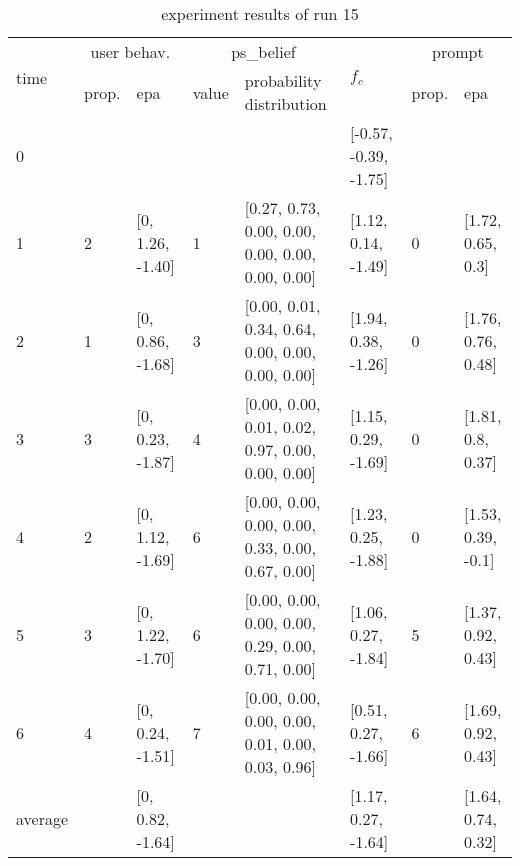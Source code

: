 \begin{table}[htbp]\footnotesize
\caption{experiment results of run 15}
\begin{center}
\begin{tabular}{|p{0.4cm}|p{0.6cm}|l|p{0.6cm}|p{3.3cm}|l|p{0.6cm}|l|}
\hline

\multirow{2}{*}{time} & \multicolumn{2}{c|}{user behav.} & \multicolumn{2}{c|}{ps\_belief} &
\multirow{2}{*}{$f_c$} & \multicolumn{2}{c|}{prompt} \\ \cline{2-5}\cline{ 7- 8}
& prop. & epa & value & probability distribution &  & prop. & epa \\ \hline

0 & \multicolumn{1}{l|}{} &  & \multicolumn{1}{l|}{} &  & [-0.57, -0.39, -1.75] & \multicolumn{1}{l|}{} &  \\ \hline
1 & 2 & [0, 1.26, -1.40] & 1 & [0.27, 0.73, 0.00, 0.00, 0.00, 0.00, 0.00, 0.00] & [1.12, 0.14, -1.49] & 0 & [1.72, 0.65, 0.3] \\ \hline
2 & 1 & [0, 0.86, -1.68] & 3 & [0.00, 0.01, 0.34, 0.64, 0.00, 0.00, 0.00, 0.00] & [1.94, 0.38, -1.26] & 0 & [1.76, 0.76, 0.48] \\ \hline
3 & 3 & [0, 0.23, -1.87] & 4 & [0.00, 0.00, 0.01, 0.02, 0.97, 0.00, 0.00, 0.00] & [1.15, 0.29, -1.69] & 0 & [1.81, 0.8, 0.37] \\ \hline
4 & 2 & [0, 1.12, -1.69] & 6 & [0.00, 0.00, 0.00, 0.00, 0.33, 0.00, 0.67, 0.00] & [1.23, 0.25, -1.88] & 0 & [1.53, 0.39, -0.1] \\ \hline
5 & 3 & [0, 1.22, -1.70] & 6 & [0.00, 0.00, 0.00, 0.00, 0.29, 0.00, 0.71, 0.00] & [1.06, 0.27, -1.84] & 5 & [1.37, 0.92, 0.43] \\ \hline
6 & 4 & [0, 0.24, -1.51] & 7 & [0.00, 0.00, 0.00, 0.00, 0.01, 0.00, 0.03, 0.96] & [0.51, 0.27, -1.66] & 6 & [1.69, 0.92, 0.43] \\ \hline
\multicolumn{1}{|l|}{average} & \multicolumn{1}{l|}{} & [0, 0.82, -1.64] & \multicolumn{1}{l|}{} &  & [1.17, 0.27, -1.64] & \multicolumn{1}{l|}{} & [1.64, 0.74, 0.32] \\ \hline
\end{tabular}
\end{center}
\label{}
\end{table}


